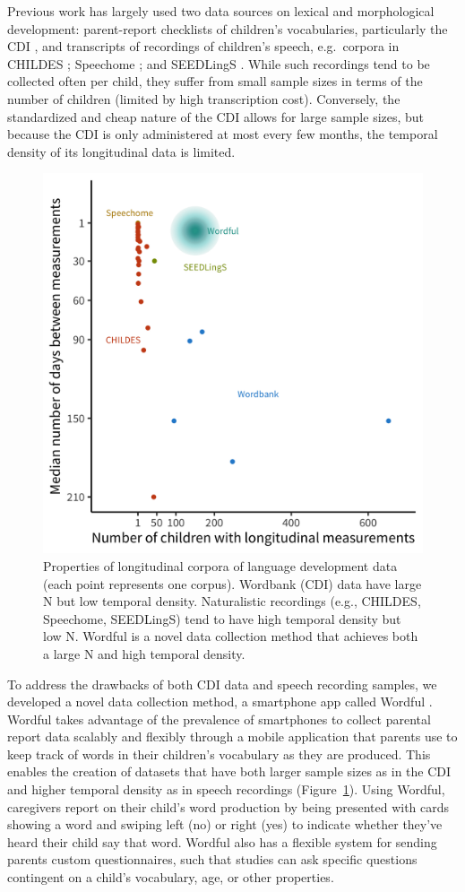 \documentclass[
   11pt,
       ]{book}
\begin{document}
Previous work has largely used two data sources on lexical and morphological development: parent-report checklists of children's vocabularies, particularly the CDI \citep{fenson2007}, and transcripts of recordings of children's speech, e.g.~corpora in CHILDES \citep{macwhinney2000}; Speechome \citep{roy2015}; and SEEDLingS \citep{bergelson2016}. While such recordings tend to be collected often per child, they suffer from small sample sizes in terms of the number of children (limited by high transcription cost). Conversely, the standardized and cheap nature of the CDI allows for large sample sizes, but because the CDI is only administered at most every few months, the temporal density of its longitudinal data is limited.

\begin{figure}

{\centering \includegraphics[width=0.6\linewidth]{05-conclusion/corpus_stats} 

}

\caption{Properties of longitudinal corpora of language development data (each point represents one corpus). Wordbank (CDI) data have large N but low temporal density. Naturalistic recordings (e.g., CHILDES, Speechome, SEEDLingS) tend to have high temporal density but low N. Wordful is a novel data collection method that achieves both a large N and high temporal density.}\label{fig:wordful-motivation}
\end{figure}

To address the drawbacks of both CDI data and speech recording samples, we developed a novel data collection method, a smartphone app called Wordful \citep{meylan2019}. Wordful takes advantage of the prevalence of smartphones to collect parental report data scalably and flexibly through a mobile application that parents use to keep track of words in their children's vocabulary as they are produced. This enables the creation of datasets that have both larger sample sizes as in the CDI and higher temporal density as in speech recordings (Figure~\ref{fig:wordful-motivation}). Using Wordful, caregivers report on their child's word production by being presented with cards showing a word and swiping left (no) or right (yes) to indicate whether they've heard their child say that word. Wordful also has a flexible system for sending parents custom questionnaires, such that studies can ask specific questions contingent on a child's vocabulary, age, or other properties.
\end{document}
